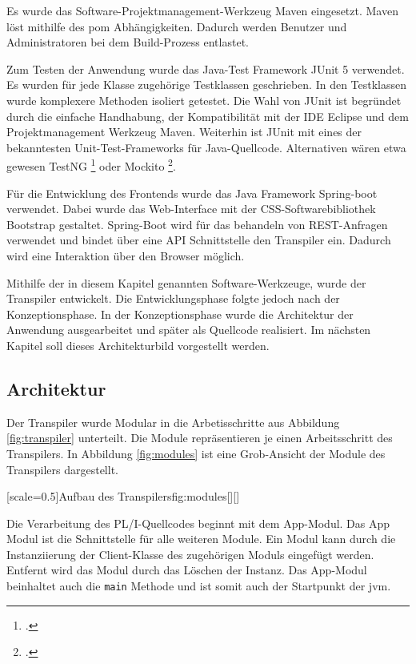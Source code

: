 Es wurde das Software-Projektmanagement-Werkzeug Maven eingesetzt. Maven löst mithilfe des \ac{pom} Abhängigkeiten. 
Dadurch werden Benutzer und Administratoren bei dem Build-Prozess entlastet.

Zum Testen der Anwendung wurde das Java-Test Framework JUnit 5 verwendet. Es wurden für jede Klasse zugehörige Testklassen geschrieben. In den Testklassen wurde komplexere Methoden isoliert getestet.
Die Wahl von JUnit ist begründet durch die einfache Handhabung, der Kompatibilität mit der IDE Eclipse und dem Projektmanagement Werkzeug Maven. Weiterhin ist JUnit mit eines der bekanntesten Unit-Test-Frameworks für Java-Quellcode. Alternativen wären etwa gewesen TestNG \footcite[Vgl. ][]{testng} oder Mockito \footcite[Vgl. ][]{mockito}.

Für die Entwicklung des Frontends wurde das Java Framework Spring-boot verwendet.
Dabei wurde das Web-Interface mit der CSS-Softwarebibliothek Bootstrap gestaltet.
Spring-Boot wird für das behandeln von REST-Anfragen verwendet und bindet über eine API Schnittstelle den Transpiler ein.
Dadurch wird eine Interaktion über den Browser möglich.

Mithilfe der in diesem Kapitel genannten Software-Werkzeuge, wurde der Transpiler entwickelt. Die Entwicklungsphase folgte jedoch nach der Konzeptionsphase.
In der Konzeptionsphase wurde die Architektur der Anwendung ausgearbeitet und später als Quellcode realisiert. 
Im nächsten Kapitel soll dieses Architekturbild vorgestellt werden.

\pagebreak
\subsection{Architektur} 

Der Transpiler wurde Modular in die Arbetisschritte aus Abbildung \ref{fig:transpiler} unterteilt.
Die Module repräsentieren je einen Arbeitsschritt des Transpilers.
In Abbildung \ref{fig:modules} ist eine Grob-Ansicht der Module des Transpilers dargestellt.

[scale=0.5]{Aufbau des Transpilers}{fig:modules}[][]

Die Verarbeitung des PL/I-Quellcodes beginnt mit dem App-Modul. Das App Modul ist die Schnittstelle für alle weiteren Module. Ein Modul kann durch die Instanziierung der Client-Klasse des zugehörigen Moduls eingefügt werden. Entfernt wird das Modul durch das Löschen der Instanz. Das App-Modul beinhaltet auch die \verb+main+ Methode und ist somit auch der Startpunkt der \ac{jvm}.

